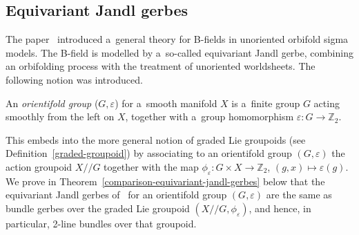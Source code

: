 \documentclass[10pt,a4paper]{amsart}
\numberwithin{equation}{section}
\def\Z {\mathbb{Z}}
\def\act#1#2{#1/\!\!/#2}
\begin{document}
\subsection{Equivariant Jandl gerbes}
\label{equivariant-Jandl-gerbes}

The paper~\cite{gawedzki8} introduced a~general theory for B-fields in unoriented orbifold sigma models. The B-field is modelled by a~so-called equivariant Jandl gerbe, combining an orbifolding process with the treatment of unoriented worldsheets. The following notion was introduced.

\begin{Definition}
 An \emph{orientifold group} ($G,\varepsilon$) for a~smooth manifold $X$ is a~finite group $G$ acting smoothly from the left on $X$,
 together with a~group homomorphism $\varepsilon\colon G \to \mathbb{Z}_2$.
\end{Definition}

This embeds into the more general notion of graded Lie groupoids (see Definition~\ref{graded-groupoid}) by associating to an orientifold group $(G,\varepsilon)$ the action groupoid $\act XG$ together with the map $\phi_{\varepsilon}\colon G \times X \to \Z_2$, $(g,x)\mapsto \varepsilon(g)$.
We prove in Theorem~\ref{comparison-equivariant-jandl-gerbes} below that the equivariant Jandl gerbes of~\cite{gawedzki8} for an orientifold group $(G,\varepsilon)$ are the same as bundle gerbes over the graded Lie groupoid $(\act XG,\phi_{\varepsilon})$, and hence, in particular, 2-line bundles over that groupoid.
\end{document}
